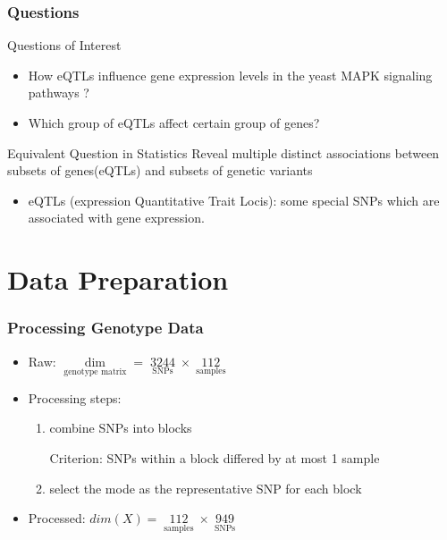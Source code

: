 \begin{frame}\frametitle{ Questions}

    \begin{block}{Questions of Interest}
        \begin{itemize}
        \item How eQTLs influence gene expression levels in the yeast MAPK signaling pathways ?
        \item Which group of eQTLs affect certain group of genes?
        \end{itemize}
        
        
    \end{block}
    
    \begin{block}{Equivalent Question in Statistics}
        Reveal multiple distinct associations between subsets of genes(eQTLs) and subsets of genetic variants
    \end{block}
    	\begin{itemize}
		\item eQTLs (expression Quantitative Trait Locis): some special SNPs which are associated with gene expression. 
	\end{itemize}
\end{frame}


\section{Data Preparation}
\begin{frame}
    \sectionpage
\end{frame}

\begin{frame}
    \frametitle{Processing Genotype Data}
	\begin{itemize}
	\item Raw: $\mathop{dim(X)}\limits_{\text{genotype matrix}}=\mathop{3244}\limits_{\text{SNPs}} \times \mathop{112}\limits_{\text{samples}} $
	\item Processing steps:
	\begin{enumerate}
		\item combine SNPs into blocks
		
		Criterion: SNPs within a block differed by at most 1 sample
		\item select the mode as the representative SNP for each block
	\end{enumerate}
	\item Processed: $dim(X)=\mathop{112}\limits_{\text{samples}}\times\mathop{949}\limits_{\text{SNPs}}$
    \end{itemize}
\end{frame}

